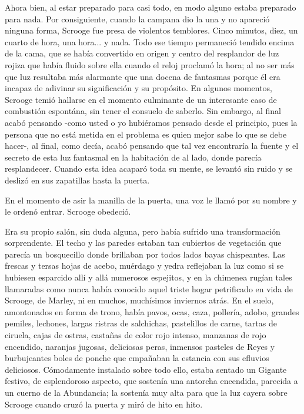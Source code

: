 \documentclass{novela}
\begin{document}
 Ahora bien, al estar preparado para casi todo, en modo alguno estaba preparado para nada. Por consiguiente, cuando la campana dio la una y no apareció ninguna forma, Scrooge fue presa de violentos temblores. Cinco minutos, diez, un cuarto de hora, una hora... y nada. Todo ese tiempo permaneció tendido encima de la cama, que se había convertido en origen y centro del resplandor de luz rojiza que había fluido sobre ella cuando el reloj proclamó la hora; al no ser más que luz resultaba más alarmante que una docena de fantasmas porque él era incapaz de adivinar su significación y su propósito. En algunos momentos, Scrooge temió hallarse en el momento culminante de un interesante caso de combustión espontána, sin tener el consuelo de saberlo. Sin embargo, al final acabó pensando -como usted o yo hubiéramos pensado desde el principio, pues la persona que no está metida en el problema es quien mejor sabe lo que se debe hacer-, al final, como decía, acabó pensando que tal vez encontraría la fuente y el secreto de esta luz fantasmal en la habitación de al lado, donde parecía resplandecer. Cuando esta idea acaparó toda su mente, se levantó sin ruido y se deslizó en sus zapatillas hasta la puerta.

 En el momento de asir la manilla de la puerta, una voz le llamó por su nombre y le ordenó entrar. Scrooge obedeció.

 Era su propio salón, sin duda alguna, pero había sufrido una transformación sorprendente. El techo y las paredes estaban tan cubiertos de vegetación que parecía un bosquecillo donde brillaban por todos lados bayas chispeantes. Las frescas y tersas hojas de acebo, muérdago y yedra reflejaban la luz como si se hubiesen esparcido allí y allá numerosos espejitos, y en la chimenea rugían tales llamaradas como nunca había conocido aquel triste hogar petrificado en vida de Scrooge, de Marley, ni en muchos, muchísimos inviernos atrás. En el suelo, amontonados en forma de trono, había pavos, ocas, caza, pollería, adobo, grandes pemiles, lechones, largas ristras de salchichas, pastelillos de carne, tartas de ciruela, cajas de ostras, castañas de color rojo intenso, manzanas de rojo encendido, naranjas jugosas, deliciosas peras, inmensos pasteles de Reyes y burbujeantes boles de ponche que empañaban la estancia con sus efluvios deliciosos. Cómodamente instalado sobre todo ello, estaba sentado un Gigante festivo, de esplendoroso aspecto, que sostenía una antorcha encendida, parecida a un cuerno de la Abundancia; la sostenía muy alta para que la luz cayera sobre Scrooge cuando cruzó la puerta y miró de hito en hito.
\end{document}
